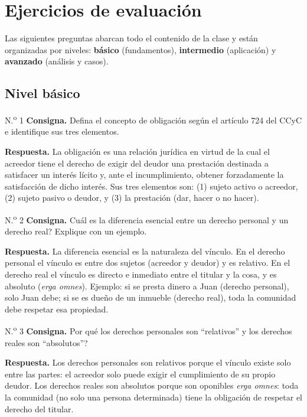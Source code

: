 \documentclass[12pt,oneside]{book}
\begin{document}
\chapter[Ejercicios]{Ejercicios de evaluaci\'on}

Las siguientes preguntas abarcan todo el contenido de la clase y est\'an organizadas por niveles: \textbf{b\'asico} (fundamentos), \textbf{intermedio} (aplicaci\'on) y \textbf{avanzado} (an\'alisis y casos).

\section{Nivel b\'asico}

\begin{exercise}{N.\textsuperscript{o} 1}
\textbf{Consigna.} Defina el concepto de obligaci\'on seg\'un el art\'iculo 724 del CCyC e identifique sus tres elementos.

\textbf{Respuesta.} La obligaci\'on es una relaci\'on jur\'idica en virtud de la cual el acreedor tiene el derecho de exigir del deudor una prestaci\'on destinada a satisfacer un inter\'es l\'icito y, ante el incumplimiento, obtener forzadamente la satisfacci\'on de dicho inter\'es. Sus tres elementos son: (1) sujeto activo o acreedor, (2) sujeto pasivo o deudor, y (3) la prestaci\'on (dar, hacer o no hacer).
\end{exercise}

\begin{exercise}{N.\textsuperscript{o} 2}
\textbf{Consigna.} \textquestiondown Cu\'al es la diferencia esencial entre un derecho personal y un derecho real? Explique con un ejemplo.

\textbf{Respuesta.} La diferencia esencial es la naturaleza del v\'inculo. En el derecho personal el v\'inculo es entre dos sujetos (acreedor y deudor) y es relativo. En el derecho real el v\'inculo es directo e inmediato entre el titular y la cosa, y es absoluto (\textit{erga omnes}). Ejemplo: si se presta dinero a Juan (derecho personal), solo Juan debe; si se es due\~no de un inmueble (derecho real), toda la comunidad debe respetar esa propiedad.
\end{exercise}

\begin{exercise}{N.\textsuperscript{o} 3}
\textbf{Consigna.} \textquestiondown Por qu\'e los derechos personales son ``relativos'' y los derechos reales son ``absolutos''?

\textbf{Respuesta.} Los derechos personales son relativos porque el v\'inculo existe solo entre las partes: el acreedor solo puede exigir el cumplimiento de su propio deudor. Los derechos reales son absolutos porque son oponibles \textit{erga omnes}: toda la comunidad (no solo una persona determinada) tiene la obligaci\'on de respetar el derecho del titular.
\end{exercise}
\end{document}
